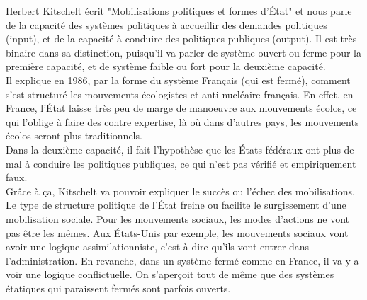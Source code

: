 \documentclass[10pt, a4paper, openany]{book}
\begin{document}
Herbert Kitschelt écrit "Mobilisations politiques et formes d'État" et nous parle de la capacité des systèmes politiques à accueillir des demandes politiques (input), et de la capacité à conduire des politiques publiques (output). Il est très binaire dans sa distinction, puisqu'il va parler de système ouvert ou ferme pour la première capacité, et de système faible ou fort pour la deuxième capacité. \\
Il explique en 1986, par la forme du système Français (qui est fermé), comment s'est structuré les mouvements écologistes et anti-nucléaire français. En effet, en France, l'État laisse très peu de marge de manoeuvre aux mouvements écolos, ce qui l'oblige à faire des contre expertise, là où dans d'autres pays, les mouvements écolos seront plus traditionnels. \\
Dans la deuxième capacité, il fait l'hypothèse que les États fédéraux ont plus de mal à conduire les politiques publiques, ce qui n'est pas vérifié et empiriquement faux. \\
Grâce à ça, Kitschelt va pouvoir expliquer le succès ou l'échec des mobilisations. Le type de structure politique de l'État freine ou facilite le surgissement d'une mobilisation sociale. Pour les mouvements sociaux, les modes d'actions ne vont pas être les mêmes. Aux États-Unis par exemple, les mouvements sociaux vont avoir une logique assimilationniste, c'est à dire qu'ils vont entrer dans l'administration. En revanche, dans un système fermé comme en France, il va y a voir une logique conflictuelle. On s'aperçoit tout de même que des systèmes étatiques qui paraissent fermés sont parfois ouverts.
\end{document}
